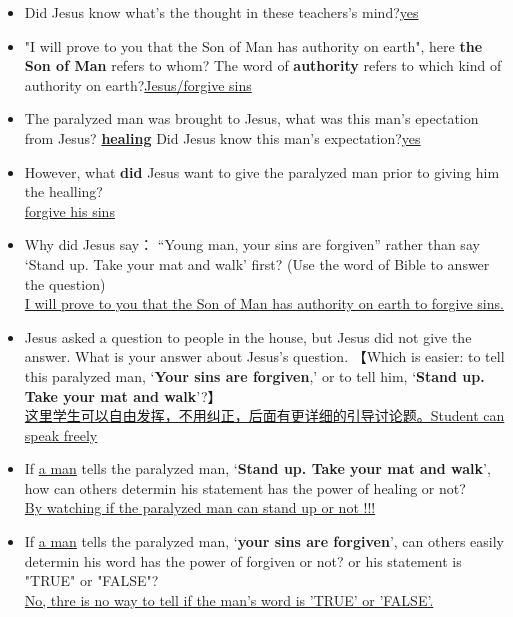 \begin{itemize}[noitemsep]
\item Did Jesus know what's the thought in these teachers's mind?\underline{yes}\\

\item "I will prove to you that the Son of Man has authority on earth", here \textbf{the Son of Man} refers to whom? The word of \textbf{authority} refers to which kind of authority on earth?\underline{Jesus/forgive sins}\\

\item The paralyzed man was brought to Jesus, what was this man's epectation from Jesus? \textbf{\underline{healing}} Did Jesus know this man's expectation?\underline{yes}\\

\item However, what \textbf{did} Jesus want to give the paralyzed man prior to giving him the healling?\\
\underline{forgive his sins}\\

\item Why did Jesus say： “Young man, your sins are forgiven” rather than say ‘Stand up. Take your mat and walk’ first? (Use the word of Bible to answer the question)\\
\underline{I will prove to you that the Son of Man has authority on earth to forgive sins.}\\

\item Jesus asked a question to people in the house, but Jesus did not give the answer. What is your answer about Jesus's question. 【Which is easier: to tell this paralyzed man, ‘\textbf{Your sins are forgiven},’ or to tell him, ‘\textbf{Stand up. Take your mat and walk}’?】\\
\underline{这里学生可以自由发挥，不用纠正，后面有更详细的引导讨论题。Student can speak freely}\\

\item If \underline{a man} tells the paralyzed man, ‘\textbf{Stand up. Take your mat and walk}’, how can others determin his statement has the power of healing or not?\\
\underline{By watching if the paralyzed man can stand up or not !!! }\\

\item If \underline{a man} tells the paralyzed man, ‘\textbf{your sins are forgiven}’, can others easily determin his word has the power of forgiven or not? or his statement is "TRUE" or "FALSE"?\\
\underline{No, thre is no way to tell if the man's word is 'TRUE' or 'FALSE'.}\\


\end{itemize}
